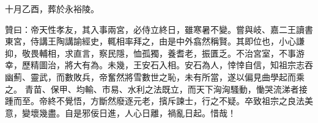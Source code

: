 \begin{pinyinscope}
 十月乙酉，葬於永裕陵。



 贊曰：帝天性孝友，其入事兩宮，必侍立終日，雖寒暑不變。嘗與岐、嘉二王讀書東宮，侍講王陶講諭經史，輒相率拜之，由是中外翕然稱賢。其即位也，小心謙抑，敬畏輔相，求直言，察民隱，恤孤獨，養耆老，振匱乏。不治宮室，不事游幸，歷精圖治，將大有為。未幾，王安石入相。安石為人，悻悻自信，知祖宗志吞幽薊、靈武，而數敗兵，帝奮然將雪數世之恥，未有所當，遂以偏見曲學起而乘之。
 青苗、保甲、均輸、市易、水利之法既立，而天下洶洶騷動，慟哭流涕者接踵而至。帝終不覺悟，方斷然廢逐元老，擯斥諫士，行之不疑。卒致祖宗之良法美意，變壞幾盡。自是邪佞日進，人心日離，禍亂日起。惜哉！



\end{pinyinscope}